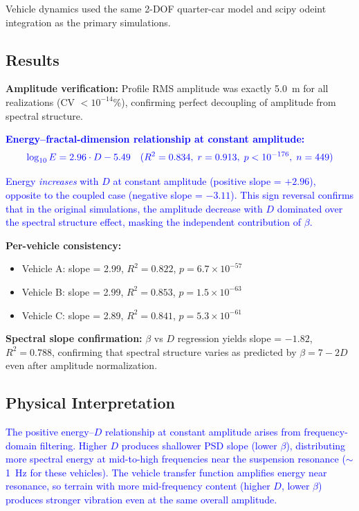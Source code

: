 \documentclass[11pt]{article}
\begin{document}
Vehicle dynamics used the same 2-DOF quarter-car model and scipy odeint integration as the primary simulations.

\subsection{Results}

\textbf{Amplitude verification:} Profile RMS amplitude was exactly 5.0~m for all realizations (CV $< 10^{-14}$\%), confirming perfect decoupling of amplitude from spectral structure.

\textcolor{blue}{\textbf{Energy--fractal-dimension relationship at constant amplitude:}}
\begin{equation}
\textcolor{blue}{\log_{10} E = 2.96 \cdot D - 5.49 \quad (R^2 = 0.834,\; r = 0.913,\; p < 10^{-176},\; n = 449)}
\end{equation}

\textcolor{blue}{Energy \emph{increases} with $D$ at constant amplitude (positive slope = $+2.96$), opposite to the coupled case (negative slope = $-3.11$). This sign reversal confirms that in the original simulations, the amplitude decrease with $D$ dominated over the spectral structure effect, masking the independent contribution of $\beta$.}

\textbf{Per-vehicle consistency:}
\begin{itemize}
\item Vehicle A: slope = 2.99, $R^2 = 0.822$, $p = 6.7 \times 10^{-57}$
\item Vehicle B: slope = 2.99, $R^2 = 0.853$, $p = 1.5 \times 10^{-63}$
\item Vehicle C: slope = 2.89, $R^2 = 0.841$, $p = 5.3 \times 10^{-61}$
\end{itemize}

\textbf{Spectral slope confirmation:} $\beta$ vs $D$ regression yields slope = $-1.82$, $R^2 = 0.788$, confirming that spectral structure varies as predicted by $\beta = 7-2D$ even after amplitude normalization.

\subsection{Physical Interpretation}

\textcolor{blue}{The positive energy--$D$ relationship at constant amplitude arises from frequency-domain filtering. Higher $D$ produces shallower PSD slope (lower $\beta$), distributing more spectral energy at mid-to-high frequencies near the suspension resonance ($\sim$1~Hz for these vehicles). The vehicle transfer function amplifies energy near resonance, so terrain with more mid-frequency content (higher $D$, lower $\beta$) produces stronger vibration even at the same overall amplitude.}
\end{document}
